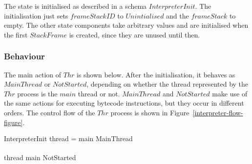The state is initialised as described in a schema $InterpreterInit$.
The initialisation just sets $frameStackID$ to $Unintialised$ and the
$frameStack$ to empty.
The other state components take arbitrary values and are initialised
when the first $StackFrame$ is created, since they are unused until
then.

\subsubsection*{Behaviour}

The main action of $Thr$ is shown below. 
After the initialisation, it behaves as $MainThread$ or $NotStarted$,
depending on whether the thread represented by the $Thr$ process is
the $main$ thread or not.
$MainThread$ and $NotStarted$ make use of the same actions for
executing bytecode instructions, but they occur in different orders.
The control flow of the $Thr$ process is shown in
Figure~\ref{interpreter-flow-figure}.
\begin{circusaction}
  \circspot \lschexpract InterpreterInit \rschexpract \circseq {}
  \circblockbegin
    \lcircguard thread = main \rcircguard \circguard MainThread \\
    {} \extchoice {} \\
    \lcircguard thread \neq main \rcircguard \circguard NotStarted
  \circblockend
\end{circusaction}

